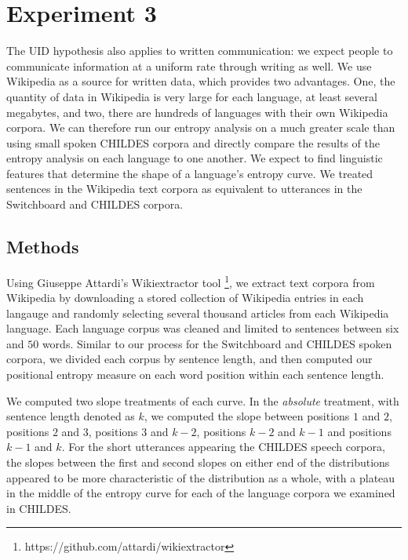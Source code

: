 \documentclass[10pt, letterpaper]{article}
\begin{document}
\hypertarget{experiment-3}{%
\section{Experiment 3}\label{experiment-3}}

The UID hypothesis also applies to written communication: we expect
people to communicate information at a uniform rate through writing as
well. We use Wikipedia as a source for written data, which provides two
advantages. One, the quantity of data in Wikipedia is very large for
each language, at least several megabytes, and two, there are hundreds
of languages with their own Wikipedia corpora. We can therefore run our
entropy analysis on a much greater scale than using small spoken CHILDES
corpora and directly compare the results of the entropy analysis on each
language to one another. We expect to find linguistic features that
determine the shape of a language's entropy curve. We treated sentences
in the Wikipedia text corpora as equivalent to utterances in the
Switchboard and CHILDES corpora.

\hypertarget{methods}{%
\subsection{Methods}\label{methods}}

Using Giuseppe Attardi's Wikiextractor tool
\footnote{https://github.com/attardi/wikiextractor}, we extract text
corpora from Wikipedia by downloading a stored collection of Wikipedia
entries in each langauge and randomly selecting several thousand
articles from each Wikipedia language. Each language corpus was cleaned
and limited to sentences between six and \(50\) words. Similar to our
process for the Switchboard and CHILDES spoken corpora, we divided each
corpus by sentence length, and then computed our positional entropy
measure on each word position within each sentence length.

We computed two slope treatments of each curve. In the \emph{absolute}
treatment, with sentence length denoted as \(k\), we computed the slope
between positions \(1\) and \(2\), positions \(2\) and \(3\), positions
\(3\) and \(k-2\), positions \(k-2\) and \(k-1\) and positions \(k-1\)
and \(k\). For the short utterances appearing the CHILDES speech
corpora, the slopes between the first and second slopes on either end of
the distributions appeared to be more characteristic of the distribution
as a whole, with a plateau in the middle of the entropy curve for each
of the language corpora we examined in CHILDES.
\end{document}
